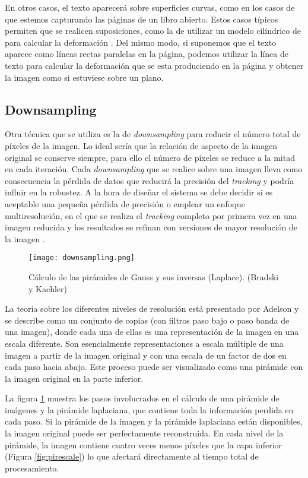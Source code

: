 En otros casos, el texto aparecerá sobre superficies curvas, como en los casos de que estemos capturando las páginas de un libro abierto. Estos casos típicos permiten que se realicen suposiciones, como la de utilizar un modelo cilíndrico de para calcular la deformación \cite{Kanungo}. Del mismo modo, si suponemos que el texto aparece como líneas rectas paralelas en la página, podemos utilizar la línea de texto para calcular la deformación que se esta produciendo en la página y obtener la imagen como si estuviese sobre un plano.

\subsection{Downsampling}
Otra técnica que se utiliza es la de \emph{downsampling} para reducir el número total de píxeles de la imagen. Lo ideal sería que la relación de aspecto de la imagen original se conserve siempre, para ello el número de píxeles se reduce a la mitad en cada iteración. Cada \emph{downsampling} que se realice sobre una imagen lleva como consecuencia la pérdida de datos que reducirá la precisión del \textit{tracking} y podría influir en la robustez. A la hora de diseñar el sistema se debe decidir si es aceptable una pequeña pérdida de precisión o emplear un enfoque multiresolución, en el que se realiza el \textit{tracking} completo por primera vez en una imagen reducida y los resultados se refinan con versiones de mayor resolución de la imagen \cite{Klein}.

\begin{figure}
  \centering
  \texttt{[image: downsampling.png]}
  \caption{Cálculo de las pirámides de Gauss y sus inversas (Laplace). (Bradski y Kaehler)}

  \label{fig:pirámides}
\end{figure}

La teoría sobre los diferentes niveles de resolución está presentado por Adelson \cite{Adelson} y se describe como un conjunto de copias (con filtros paso bajo o paso banda de una imagen), donde cada una de ellas es una representación de la imagen en una escala diferente. Son esencialmente representaciones a escala múltiple de una imagen a partir de la imagen original y con una escala de un factor de dos en cada paso hacia abajo. Este proceso puede ser visualizado como una pirámide con la imagen original en la parte inferior. 

La figura \ref{fig:pirámides} muestra los pasos involucrados en el cálculo de una pirámide de imágenes y la pirámide laplaciana, que contiene toda la información perdida en cada paso. Si la pirámide de la imagen y la pirámide laplaciana están disponibles, la imagen original puede ser perfectamente reconstruida. En cada nivel de la pirámide, la imagen contiene cuatro veces menos píxeles que la capa inferior (Figura \ref{fig:pirescale}) lo que afectará directamente al tiempo total de procesamiento. 

